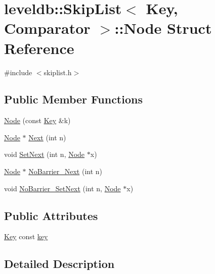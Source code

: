\hypertarget{structleveldb_1_1_skip_list_1_1_node}{}\section{leveldb\+:\+:Skip\+List$<$ Key, Comparator $>$\+:\+:Node Struct Reference}
\label{structleveldb_1_1_skip_list_1_1_node}


{\ttfamily \#include $<$skiplist.\+h$>$}

\subsection*{Public Member Functions}
\begin{DoxyCompactItemize}
\item 
\hyperlink{structleveldb_1_1_skip_list_1_1_node_a7dec52445f4f05892239a77407d109b0}{Node} (const \hyperlink{namespaceleveldb_a7e9a9725b13fa0bd922d885280dfab95}{Key} \&k)
\item 
\hyperlink{structleveldb_1_1_skip_list_1_1_node}{Node} $\ast$ \hyperlink{structleveldb_1_1_skip_list_1_1_node_aca7f18fc57f6c8e8a8dfe176eedbde74}{Next} (int n)
\item 
void \hyperlink{structleveldb_1_1_skip_list_1_1_node_a46c7cc10db3d77c85df7e411b720a8f4}{Set\+Next} (int n, \hyperlink{structleveldb_1_1_skip_list_1_1_node}{Node} $\ast$x)
\item 
\hyperlink{structleveldb_1_1_skip_list_1_1_node}{Node} $\ast$ \hyperlink{structleveldb_1_1_skip_list_1_1_node_a96b7213d1fd9ef893f3a7baecc5c4801}{No\+Barrier\+\_\+\+Next} (int n)
\item 
void \hyperlink{structleveldb_1_1_skip_list_1_1_node_af93b362f5e38fcf645820e02377cca64}{No\+Barrier\+\_\+\+Set\+Next} (int n, \hyperlink{structleveldb_1_1_skip_list_1_1_node}{Node} $\ast$x)
\end{DoxyCompactItemize}
\subsection*{Public Attributes}
\begin{DoxyCompactItemize}
\item 
\hyperlink{namespaceleveldb_a7e9a9725b13fa0bd922d885280dfab95}{Key} const \hyperlink{structleveldb_1_1_skip_list_1_1_node_a654f196e057edd294e4dbcbb6dabb844}{key}
\end{DoxyCompactItemize}


\subsection{Detailed Description}
